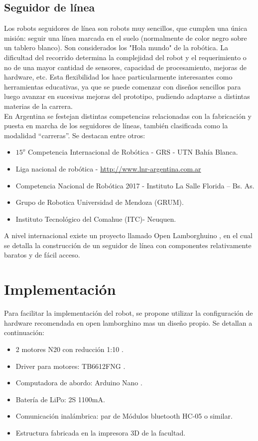 \documentclass[10pt,conference,a4paper,onecolumn]{article}%
\begin{document}
 \subsection{Seguidor de línea}
 Los robots seguidores de línea son robots muy sencillos, que cumplen una única misión: seguir una línea marcada en el suelo (normalmente de color negro sobre un tablero blanco). Son considerados los "Hola mundo" de la robótica. La dificultad del recorrido determina la complejidad del robot y el requerimiento o no de una mayor cantidad de sensores, capacidad de procesamiento, mejoras de hardware, etc. Esta flexibilidad los hace particularmente interesantes como herramientas educativas, ya que se puede comenzar con diseños sencillos para luego avanzar en sucesivas mejoras del prototipo, pudiendo adaptarse a distintas materias de
la carrera.\\
En Argentina se festejan distintas competencias relacionadas con la fabricación y puesta en marcha de los seguidores de líneas, también clasificada como la modalidad “carreras”. Se destacan entre otros:
\begin{itemize}
\item $15^o$ Competencia Internacional de Robótica - GRS - UTN Bahía Blanca.
\item Liga nacional de robótica - \url{http://www.lnr-argentina.com.ar}
\item Competencia Nacional de Robótica 2017 - Instituto La Salle Florida – Bs. As.
\item Grupo de Robotica Universidad de Mendoza (GRUM).
\item Instituto Tecnológico del Comahue (ITC)- Neuquen.
\end{itemize}
A nivel internacional existe un proyecto llamado Open Lamborghuino \cite{lambo}, en el cual se detalla la construcción
de un seguidor de línea con componentes relativamente baratos y de fácil acceso.

\section{Implementación}
Para facilitar la implementación del robot, se propone utilizar la configuración de hardware recomendada en open lamborghino mas un diseño propio. Se detallan a continuación:
\begin{itemize}
\item 2 motores N20 con reducción 1:10 \cite{motores}. 
\item Driver para motores: TB6612FNG \cite{puenteH}.
\item Computadora de abordo: Arduino Nano \cite{arduinoNano}.
\item Batería de LiPo: 2S 1100mA.
\item Comunicación inalámbrica: par de Módulos bluetooth HC-05 o similar.  
\item Estructura fabricada en la impresora 3D de la facultad.

\end{itemize}
\end{document}
